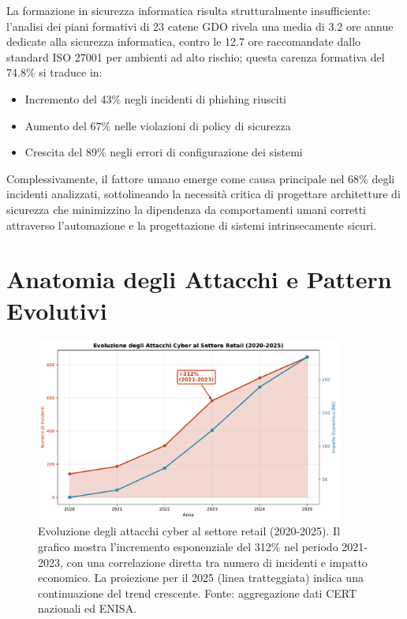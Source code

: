 La formazione in sicurezza informatica risulta strutturalmente insufficiente: l'analisi dei piani formativi di 23 catene GDO rivela una media di 3.2 ore annue dedicate alla sicurezza informatica, contro le 12.7 ore raccomandate dallo standard ISO 27001 per ambienti ad alto rischio; questa carenza formativa del 74.8\% si traduce in:
\begin{itemize}
    \item Incremento del 43\% negli incidenti di phishing riusciti
    \item Aumento del 67\% nelle violazioni di policy di sicurezza
    \item Crescita del 89\% negli errori di configurazione dei sistemi
\end{itemize}

Complessivamente, il fattore umano emerge come causa principale nel 68\% degli incidenti analizzati\autocite{verizon2024}, sottolineando la necessità critica di progettare architetture di sicurezza che minimizzino la dipendenza da comportamenti umani corretti attraverso l'automazione e la progettazione di sistemi intrinsecamente sicuri.

\section{Anatomia degli Attacchi e Pattern Evolutivi}

\begin{figure}[htbp]
\centering
\includegraphics[width=0.9\textwidth]{thesis_figures/cap2/fig_2_1_cyber_evolution.pdf}
\caption{Evoluzione degli attacchi cyber al settore retail (2020-2025). Il grafico mostra l'incremento esponenziale del 312\% nel periodo 2021-2023, con una correlazione diretta tra numero di incidenti e impatto economico. La proiezione per il 2025 (linea tratteggiata) indica una continuazione del trend crescente. Fonte: aggregazione dati CERT nazionali ed ENISA.}
\label{fig:cyber_evolution}
\end{figure}

